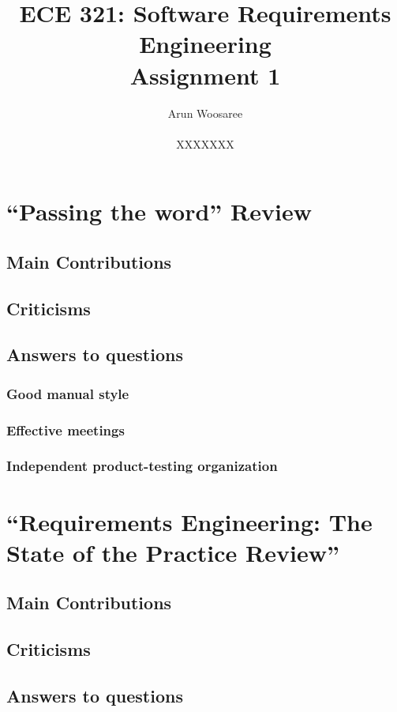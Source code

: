 \documentclass[letterpaper,12pt]{article}
\title{ECE 321: Software Requirements Engineering \\ Assignment 1}
\author{Arun Woosaree \\ \\ XXXXXXX}
\begin{document}
\maketitle

\section{``Passing the word'' Review}

\subsection{Main Contributions}
\lipsum[1]

\subsection{Criticisms}
\lipsum[2]

\subsection{Answers to questions}
\subsubsection{Good manual style}
\lipsum[66]
\subsubsection{Effective meetings}
\lipsum[66]
\subsubsection{Independent product-testing organization}
\lipsum[66]

\section{``Requirements Engineering: The State of the Practice Review''}

\subsection{Main Contributions}
\lipsum[3]

\subsection{Criticisms}
\lipsum[4]

\subsection{Answers to questions}
\end{document}
